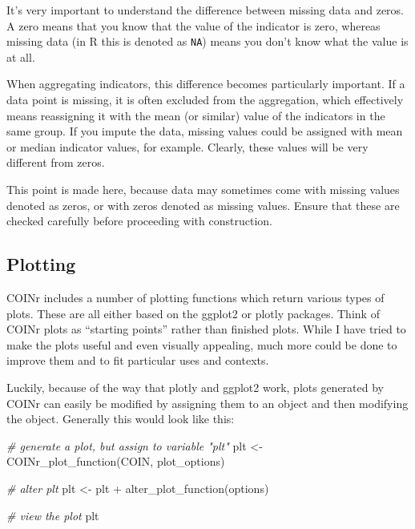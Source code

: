 \documentclass[
]{book}
\newenvironment{Shaded}{\begin{snugshade}}{\end{snugshade}}
\newcommand{\CommentTok}[1]{\textcolor[rgb]{0.56,0.35,0.01}{\textit{#1}}}
\newcommand{\FunctionTok}[1]{\textcolor[rgb]{0.00,0.00,0.00}{#1}}
\newcommand{\NormalTok}[1]{#1}
\newcommand{\OtherTok}[1]{\textcolor[rgb]{0.56,0.35,0.01}{#1}}
\newcommand{\SpecialCharTok}[1]{\textcolor[rgb]{0.00,0.00,0.00}{#1}}
\begin{document}
It's very important to understand the difference between missing data and zeros. A zero means that you know that the value of the indicator is zero, whereas missing data (in R this is denoted as \texttt{NA}) means you don't know what the value is at all.

When aggregating indicators, this difference becomes particularly important. If a data point is missing, it is often excluded from the aggregation, which effectively means reassigning it with the mean (or similar) value of the indicators in the same group. If you impute the data, missing values could be assigned with mean or median indicator values, for example. Clearly, these values will be very different from zeros.

This point is made here, because data may sometimes come with missing values denoted as zeros, or with zeros denoted as missing values. Ensure that these are checked carefully before proceeding with construction.

\hypertarget{plotting}{%
\subsection{Plotting}\label{plotting}}

COINr includes a number of plotting functions which return various types of plots. These are all either based on the ggplot2 or plotly packages. Think of COINr plots as ``starting points'' rather than finished plots. While I have tried to make the plots useful and even visually appealing, much more could be done to improve them and to fit particular uses and contexts.

Luckily, because of the way that plotly and ggplot2 work, plots generated by COINr can easily be modified by assigning them to an object and then modifying the object. Generally this would look like this:

\begin{Shaded}
\begin{Highlighting}[]
\CommentTok{\# generate a plot, but assign to variable "plt"}
\NormalTok{plt }\OtherTok{\textless{}{-}} \FunctionTok{COINr\_plot\_function}\NormalTok{(COIN, plot\_options)}

\CommentTok{\# alter plt}
\NormalTok{plt }\OtherTok{\textless{}{-}}\NormalTok{ plt }\SpecialCharTok{+} \FunctionTok{alter\_plot\_function}\NormalTok{(options)}

\CommentTok{\# view the plot}
\NormalTok{plt}
\end{Highlighting}
\end{Shaded}
\end{document}
